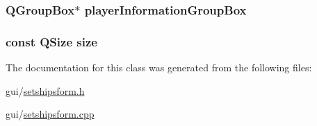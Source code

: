\subsubsection[{\texorpdfstring{player\+Information\+Group\+Box}{playerInformationGroupBox}}]{\setlength{\rightskip}{0pt plus 5cm}Q\+Group\+Box$\ast$ player\+Information\+Group\+Box\hspace{0.3cm}{\ttfamily [private]}}\hypertarget{classSetShipsForm_ad382b647f03157d361b01d38047aa9c2}{}\label{classSetShipsForm_ad382b647f03157d361b01d38047aa9c2}
\subsubsection[{\texorpdfstring{size}{size}}]{\setlength{\rightskip}{0pt plus 5cm}const Q\+Size size\hspace{0.3cm}{\ttfamily [private]}}\hypertarget{classSetShipsForm_a28b453b66a8e010eaaab755d702f299d}{}\label{classSetShipsForm_a28b453b66a8e010eaaab755d702f299d}


The documentation for this class was generated from the following files\+:\begin{DoxyCompactItemize}
\item 
gui/\hyperlink{setshipsform_8h}{setshipsform.\+h}\item 
gui/\hyperlink{setshipsform_8cpp}{setshipsform.\+cpp}\end{DoxyCompactItemize}
